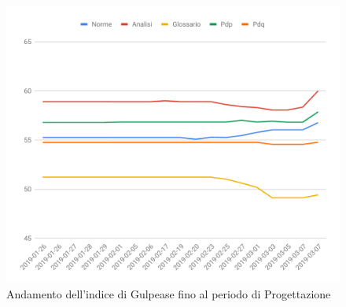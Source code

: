 \begin{figure}[H]
	\includegraphics[width=1\linewidth]{sez/App_Esito/Progettazione/graph/PR_Storico_Gulp.pdf}
	\caption{Andamento dell'indice di Gulpease fino al periodo di Progettazione}
\end{figure}
